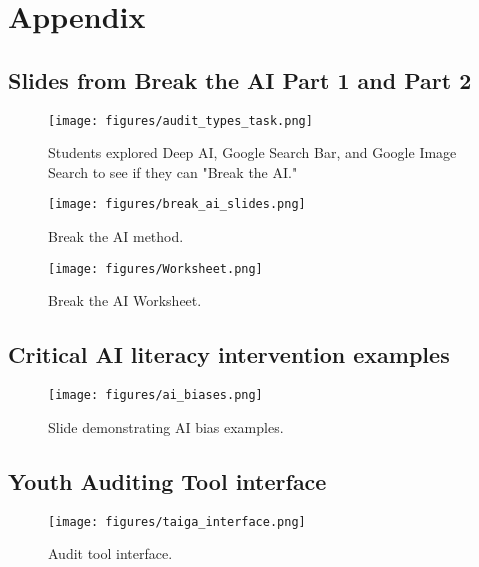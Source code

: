 \appendix

\section{Appendix}
\newpage
\subsection{Slides from Break the AI Part 1 and Part 2}
\label{appendix_BreakAI}
\begin{figure} [h!]
    \centering
    \texttt{[image: figures/audit\_types\_task.png]}
    \caption{Students explored Deep AI, Google Search Bar, and Google Image Search to see if they can "Break the AI."}
    \label{fig:threeai}
\end{figure}

\begin{figure} [htbp]
    \centering
    \texttt{[image: figures/break\_ai\_slides.png]}
    \caption{Break the AI method.}
    \label{fig:breakai}
\end{figure}

\begin{figure} [htbp]
    \centering
    \texttt{[image: figures/Worksheet.png]}
    \caption{Break the AI Worksheet.}
    \label{fig:logpage1}
\end{figure}

\newpage
\subsection{Critical AI literacy intervention examples}
\label{appendix_criticalAILiteracy}
\begin{figure}[htbp]
    \centering
    \texttt{[image: figures/ai\_biases.png]}
    \caption{Slide demonstrating AI bias examples.}
    \label{fig:aibias}
\end{figure}

\subsection{Youth Auditing Tool interface}
\label{appendix_toolInterface}
\begin{figure}[htbp]
    \centering
    \texttt{[image: figures/taiga\_interface.png]}
    \caption{Audit tool interface.}
    \label{fig:tool}
\end{figure}


